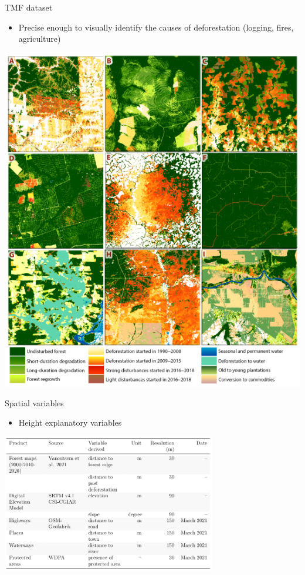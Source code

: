 \documentclass[10pt,table,dvipsnames,compress]{beamer}
\begin{document}
\begin{frame}[label={sec:orgba7ed77}]{TMF dataset}
\begin{itemize}
\item Precise enough to visually identify the causes of deforestation
(logging, fires, agriculture)
\end{itemize}

\centering \includegraphics[height=0.7\textheight]{figs/Vancutsem2021-patterns}
\end{frame}


\begin{frame}[label={sec:orgf8378d5}]{Spatial variables}
\begin{itemize}
\item Height explanatory variables
\end{itemize}

\centering \includegraphics[width=0.7\textwidth]{figs/variables-tab}
\end{frame}
\end{document}
